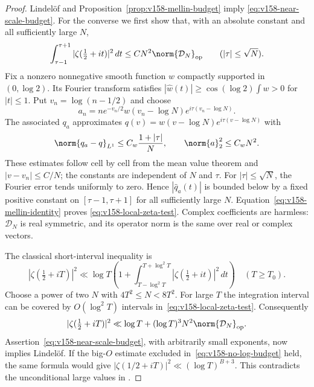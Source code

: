 \begin{proof}
Lindel\"of and Proposition~\ref{prop:v158-mellin-budget} imply
\eqref{eq:v158-near-scale-budget}. For the converse we first show that,
with an absolute constant and all sufficiently large $N$,
\begin{equation}
 \int_{\tau-1}^{\tau+1}|\zeta(\tfrac12+it)|^2\,dt
 \leq C N^2\norm{\mathcal D_N}_{\rm op}
 \qquad(|\tau|\leq\sqrt N).
 \label{eq:v158-local-zeta-test}
\end{equation}
Fix a nonzero nonnegative smooth function $w$ compactly supported in
$(0,\log2)$. Its Fourier transform satisfies
$|\widehat w(t)|\geq\cos(\log2)\int w>0$ for $|t|\leq1$.
Put $v_n=\log(n-1/2)$ and choose
\[
 a_n=n e^{-v_n/2}w(v_n-\log N)
                      e^{i\tau(v_n-\log N)}.
\]
The associated $q_a$ approximates
$q(v)=w(v-\log N)e^{i\tau(v-\log N)}$ with
\[
 \norm{q_a-q}_{L^1}\leq C_w\frac{1+|\tau|}{N},
 \qquad \norm{a}_2^2\leq C_w N^2.
\]
These estimates follow cell by cell from the mean value theorem and
$|v-v_n|\leq C/N$; the constants are independent of $N$ and $\tau$.
For $|\tau|\leq\sqrt N$, the Fourier error tends uniformly to zero.
Hence $|\widehat q_a(t)|$ is bounded below by a fixed positive constant
on $[\tau-1,\tau+1]$ for all sufficiently large $N$.
Equation~\eqref{eq:v158-mellin-identity} proves
\eqref{eq:v158-local-zeta-test}. Complex coefficients are harmless:
$\mathcal D_N$ is real symmetric, and its operator norm is the same
over real or complex vectors.

The classical short-interval inequality
\cite[Eq. (2.1)]{HuxleyIvic2007} is
\begin{equation}
 |\zeta(\tfrac12+iT)|^2\ll\log T
 \left(1+\int_{T-\log^2T}^{T+\log^2T}
                      |\zeta(\tfrac12+it)|^2\,dt\right)
 \quad(T\geq T_0).
 \label{eq:v158-short-interval}
\end{equation}
Choose a power of two $N$ with $4T^2\leq N<8T^2$.
For large $T$ the integration interval can be covered by
$O(\log^2T)$ intervals in~\eqref{eq:v158-local-zeta-test}.
Consequently
\begin{equation}
 |\zeta(\tfrac12+iT)|^2
 \ll\log T+(\log T)^3 N^2\norm{\mathcal D_N}_{\rm op}.
 \label{eq:v158-budget-to-zeta}
\end{equation}
Assertion~\eqref{eq:v158-near-scale-budget}, with arbitrarily small
exponents, now implies Lindel\"of.
If the big-$O$ estimate excluded in~\eqref{eq:v158-no-log-budget}
held, the same formula would give
$|\zeta(1/2+iT)|^2\ll(\log T)^{B+3}$.
This contradicts the unconditional large values in
\cite[Theorem 1]{Soundararajan2008}.
\end{proof}

